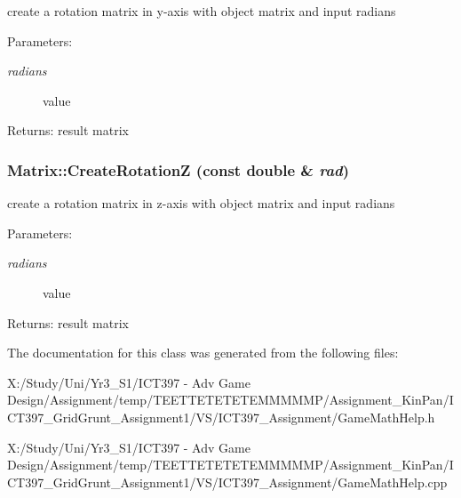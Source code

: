 create a rotation matrix in y-axis with object matrix and input radians \begin{Desc}
\item[Parameters:]
\begin{description}
\item[{\em radians}]value \end{description}
\end{Desc}
\begin{Desc}
\item[Returns:]result matrix \end{Desc}
\hypertarget{class_matrix_8fa4942a7eb0f7419f21bb75e1343afb}{
\subsubsection[CreateRotationZ]{ Matrix::CreateRotationZ (const double \& {\em rad})}}
\label{class_matrix_8fa4942a7eb0f7419f21bb75e1343afb}


create a rotation matrix in z-axis with object matrix and input radians \begin{Desc}
\item[Parameters:]
\begin{description}
\item[{\em radians}]value \end{description}
\end{Desc}
\begin{Desc}
\item[Returns:]result matrix \end{Desc}


The documentation for this class was generated from the following files:\begin{CompactItemize}
\item 
X:/Study/Uni/Yr3\_\-S1/ICT397 - Adv Game Design/Assignment/temp/TEETTETETETEMMMMMP/Assignment\_\-KinPan/ICT397\_\-GridGrunt\_\-Assignment1/VS/ICT397\_\-Assignment/GameMathHelp.h\item 
X:/Study/Uni/Yr3\_\-S1/ICT397 - Adv Game Design/Assignment/temp/TEETTETETETEMMMMMP/Assignment\_\-KinPan/ICT397\_\-GridGrunt\_\-Assignment1/VS/ICT397\_\-Assignment/GameMathHelp.cpp\end{CompactItemize}

